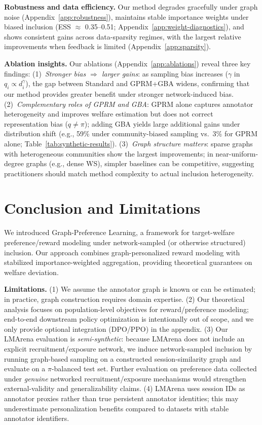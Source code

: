\documentclass{article}
\theoremstyle{plain}
\theoremstyle{definition}
\theoremstyle{remark}
\begin{document}
\textbf{Robustness and data efficiency.}
Our method degrades gracefully under graph noise (Appendix~\ref{app:robustness}), maintains stable importance weights under biased inclusion (ESS $\approx$ 0.35--0.51; Appendix~\ref{app:weight-diagnostics}), and shows consistent gains across data-sparsity regimes, with the largest relative improvements when feedback is limited (Appendix~\ref{app:sparsity}).

\textbf{Ablation insights.}
Our ablations (Appendix~\ref{app:ablations}) reveal three key findings:
(1)~\emph{Stronger bias $\Rightarrow$ larger gains}: as sampling bias increases ($\gamma$ in $q_i \propto d_i^\gamma$), the gap between Standard and GPRM+GBA widens, confirming that our method provides greater benefit under stronger network-induced bias.
(2)~\emph{Complementary roles of GPRM and GBA}: GPRM alone captures annotator heterogeneity and improves welfare estimation but does not correct representation bias ($q \neq \pi$); adding GBA yields large additional gains under distribution shift (e.g., 59\% under community-biased sampling vs.\ 3\% for GPRM alone; Table~\ref{tab:synthetic-results}).
(3)~\emph{Graph structure matters}: sparse graphs with heterogeneous communities show the largest improvements; in near-uniform-degree graphs (e.g., dense WS), simpler baselines can be competitive, suggesting practitioners should match method complexity to actual inclusion heterogeneity.

\section{Conclusion and Limitations}
\label{sec:conclusion}

We introduced Graph-Preference Learning, a framework for
target-welfare preference/reward modeling under network-sampled (or otherwise
structured) inclusion. Our approach combines graph-personalized reward modeling
with stabilized importance-weighted aggregation, providing theoretical
guarantees on welfare deviation.

\textbf{Limitations.}
(1) We assume the annotator graph is known or can be estimated; in practice, graph construction requires domain expertise.
(2) Our theoretical analysis focuses on population-level objectives for reward/preference modeling; end-to-end downstream policy optimization is intentionally out of scope, and we only provide optional integration (DPO/PPO) in the appendix.
(3) Our LMArena evaluation is \emph{semi-synthetic}: because LMArena does not include an explicit recruitment/exposure network, we induce network-sampled inclusion by running graph-based sampling on a constructed session-similarity graph and evaluate on a $\pi$-balanced test set. Further evaluation on preference data collected under \emph{genuine} networked recruitment/exposure mechanisms would strengthen external-validity and generalizability claims.
(4) LMArena uses session IDs as annotator proxies rather than true persistent annotator identities; this may underestimate personalization benefits compared to datasets with stable annotator identifiers.
\end{document}
